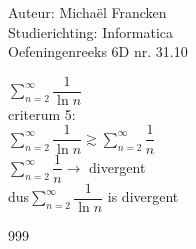 \documentclass[a4paper]{article}
\begin{document}
\noindent \large Auteur: Michaël Francken \\
\noindent \large Studierichting: Informatica\\
\noindent \large Oefeningenreeks 6D nr. 31.10\\

\medskip

\normalsize

$\displaystyle\sum\limits_{n=2}^{\infty} \dfrac{1}{\ln n}$\\

criterum 5:\\

$\displaystyle\sum\limits_{n=2}^{\infty} \dfrac{1}{\ln n}\gtrsim\displaystyle\sum\limits_{n=2}^{\infty} \dfrac{1}{n}$\\

$\displaystyle\sum\limits_{n=2}^{\infty} \dfrac{1}{n} \rightarrow$ divergent\\

dus$\displaystyle\sum\limits_{n=2}^{\infty} \dfrac{1}{\ln n}$ is divergent\\


\begin{thebibliography}{999}
\end{thebibliography}
\end{document}
